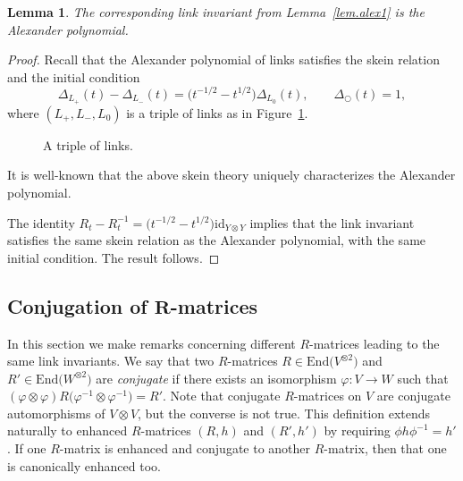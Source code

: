\documentclass[pdftex]{sigma}
\numberwithin{equation}{section}
\newtheorem{Lemma}[Theorem]{Lemma}
\theoremstyle{definition}
\begin{document}
\begin{Lemma}\label{lem.alex2}
The corresponding link invariant from Lemma~{\rm \ref{lem.alex1}} is the
Alexander polynomial.
\end{Lemma}

\begin{proof}
Recall that the Alexander polynomial of links satisfies the
skein relation and the initial condition
\begin{equation*}
\Delta_{L_+}(t) - \Delta_{L_-}(t) = \bigl(t^{-1/2} - t^{1/2}\bigr) \Delta_{L_0}(t),
\qquad \Delta_\bigcirc(t) = 1,
\end{equation*}
where $(L_+,L_-,L_0)$ is a triple of links as in Figure~\ref{fig:skein}.

\begin{figure}[htpb!]\centering
{}
\caption{A triple of links.}
\label{fig:skein}
\end{figure}

It is well-known that the above skein theory uniquely characterizes the
Alexander polynomial.

The identity
$R_t - R_t^{-1} = \bigl(t^{-1/2} - t^{1/2}\bigr) \mathrm{id}_{Y \otimes Y}$
implies that the link invariant satisfies the same skein relation as
the Alexander polynomial, with the same initial condition. The result follows.
\end{proof}


\subsection[Conjugation of R-matrices]{Conjugation of $\boldsymbol{R}$-matrices}
\label{sub.conj}

In this section we make remarks concerning different $R$-matrices
leading to the same link invariants.
We say that two $R$-matrices $R \in \mathrm{End}\bigl(V^{\otimes 2}\bigr)$ and
$R' \in \mathrm{End}\bigl(W^{\otimes 2}\bigr)$ are \emph{conjugate} if there exists an isomorphism
$\varphi\colon V \to W$ such that
$
(\varphi \otimes \varphi) R \bigl(\varphi^{-1} \otimes \varphi^{-1}\bigr) = R'$.
Note that conjugate $R$-matrices on $V$ are conjugate automorphisms of $V \otimes V$,
but the converse is not true.
This definition extends naturally to enhanced $R$-matrices $(R,h)$ and $(R',h')$
by requiring $\phi h \phi^{-1} = h'$. If one $R$-matrix is enhanced and
conjugate to another $R$-matrix, then that one is canonically enhanced too.
\end{document}
